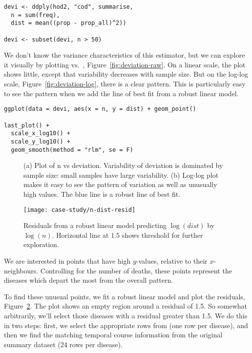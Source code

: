 \documentclass[article]{jss}
\begin{document}
\begin{Verbatim}
devi <- ddply(hod2, "cod", summarise, 
  n = sum(freq), 
  dist = mean((prop - prop_all)^2))

devi <- subset(devi, n > 50)
\end{Verbatim}

We don't know the variance characteristics of this estimator, but we can explore it visually by plotting  vs.\ , Figure~\ref{fig:deviation-raw}. On a linear scale, the plot shows little, except that variability decreases with sample size. But on the log-log scale, Figure~\ref{fig:deviation-log}, there is a clear pattern. This is particularly easy to see the pattern when we add the line of best fit from a robust linear model. 

\begin{Verbatim}
ggplot(data = devi, aes(x = n, y = dist) + geom_point()

last_plot() + 
  scale_x_log10() + 
  scale_y_log10() +
  geom_smooth(method = "rlm", se = F)
\end{Verbatim}

\begin{figure}[htbp]
  \centering

  \caption{(a) Plot of n vs deviation. Variability of deviation is dominated by sample size: small samples have large variability. (b) Log-log plot makes it easy to see the pattern of variation as well as unusually high values.  The blue line is a robust line of best fit.}
  \label{fig:deviation}
\end{figure}

\begin{figure}[htbp]
  \centering
    \texttt{[image: case-study/n-dist-resid]}
  \caption{Residuals from a robust linear model predicting $\log(dist)$ by $\log(n)$. Horizontal line at 1.5 shows threshold for further exploration.}
  \label{fig:devi-resid}
\end{figure}

We are interested in points that have high $y$-values, relative to their $x$-neighbours. Controlling for the number of deaths, these points represent the diseases which depart the most from the overall pattern.

To find these unusual points, we fit a robust linear model and plot the residuals,  Figure~\ref{fig:devi-resid}. The plot shows an empty region around a residual of 1.5. So somewhat arbitrarily, we'll select those diseases with a residual greater than 1.5. We do this in two steps: first, we select the appropriate rows from  (one row per disease), and then we find the matching temporal course information from the original summary dataset (24 rows per disease).
\end{document}
